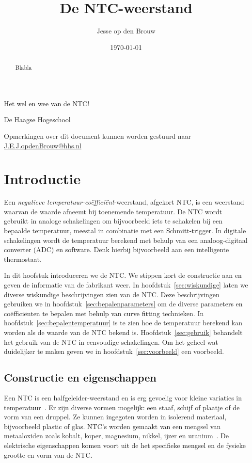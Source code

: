 \documentclass[12pt,a4paper,final,twoside,fleqn]{article}
\author{Jesse op den Brouw}
\title{De NTC-weerstand}
\date{\today}
\makeatletter
\def\maketitle{%
  \null
  \thispagestyle{empty}%
  \vskip 3cm
  \begin{center}\leavevmode
    {\LARGE \@title\par}%
    {\large \subtitle\par}%
    \vskip 1cm
    {\large \@author\par}%
    \vskip 0.03cm
    {\large De Haagse Hogeschool\par}%
    \vskip 0.03cm
    {\large \@date\par}%
  \end{center}%
  \vfill
  \null
}
\newcommand{\subtitle}{Het wel en wee van de NTC!}
\makeatother
\begin{document}
\raggedbottom

\maketitle
\begin{abstract}
\noindent
Blabla
\end{abstract}
\vspace*{2cm}

\clearpage
\tableofcontents
\clearpage
\listoffigures
\vspace{1cm}
\lstlistoflistings
\vfill
{\small
Opmerkingen over dit document kunnen worden gestuurd naar
\href{mailto:J.E.J.opdenBrouw@hhs.nl}{J.E.J.opdenBrouw@hhs.nl}
}
\clearpage


\section{Introductie}
Een \textsl{negatieve temperatuur-co\"effici\"ent}-weerstand, afgekort NTC,
is een weerstand waarvan de waarde afneemt bij toenemende temperatuur. De
NTC wordt gebruikt in analoge schakelingen om bijvoorbeeld iets te schakelen
bij een bepaalde temperatuur, meestal in combinatie met een Schmitt-trigger.
In digitale schakelingen wordt de temperatuur berekend met behulp van een
analoog-digitaal converter (ADC) en software. Denk hierbij bijvoorbeeld aan
een intelligente thermostaat.

In dit hoofstuk introduceren we de NTC. We stippen kort de constructie aan
en geven de informatie van de fabrikant weer. In hoofdstuk~\ref{sec:wiskundige}
laten we diverse wiskundige beschrijvingen zien van de NTC. Deze beschrijvingen
gebruiken we in hoofdstuk~\ref{sec:bepalenparameters}
om de diverse parameters en co\"effici\"enten te bepalen met behulp van curve
fitting technieken. In hoofdstuk~\ref{sec:bepalentemperatuur} is te zien hoe
de temperatuur berekend kan worden als de waarde van de NTC bekend is.
Hoofdstuk~\ref{sec:gebruik} behandelt het gebruik van de
NTC in eenvoudige schakelingen.
Om het geheel wat duidelijker te maken geven we in hoofdstuk~\ref{sec:voorbeeld}
een voorbeeld.

\subsection{Constructie en eigenschappen}
Een NTC is een halfgeleider-weerstand en is erg gevoelig voor kleine variaties
in temperatuur~\cite{jespersen1982thermal}. Er zijn diverse vormen mogelijk:
een staaf, schijf of plaatje of de vorm van een druppel. Ze kunnen ingegoten
worden in isolerend materiaal, bijvoorbeeld plastic of glas.
NTC's worden gemaakt van een mengsel van metaaloxiden zoals kobalt, koper,
magnesium, nikkel, ijzer en uranium~\cite{bakshi2009basic}. De elektrische
eigenschappen komen voort uit de het specifieke mengsel en de fysieke grootte
en vorm van de NTC.
\end{document}
